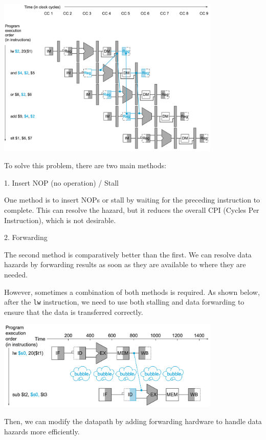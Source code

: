 \begin{center}
  \includegraphics[width=0.8\textwidth]{Figure/pipeline_load_use.png}
\end{center}

To solve this problem, there are two main methods:

1. Insert NOP (no operation) / Stall

One method is to insert NOPs or stall by waiting for the preceding instruction to complete. This can resolve the hazard, but it reduces the overall CPI (Cycles Per Instruction), which is not desirable.

2. Forwarding

The second method is comparatively better than the first. We can resolve data hazards by forwarding results as soon as they are available to where they are needed.

However, sometimes a combination of both methods is required. As shown below, after the \verb|lw| instruction, we need to use both stalling and data forwarding to ensure that the data is transferred correctly.

\begin{center}
  \includegraphics[width=0.8\textwidth]{Figure/pipeline_stall_forw.png}
\end{center}

Then, we can modify the datapath by adding forwarding hardware to handle data hazards more efficiently.

